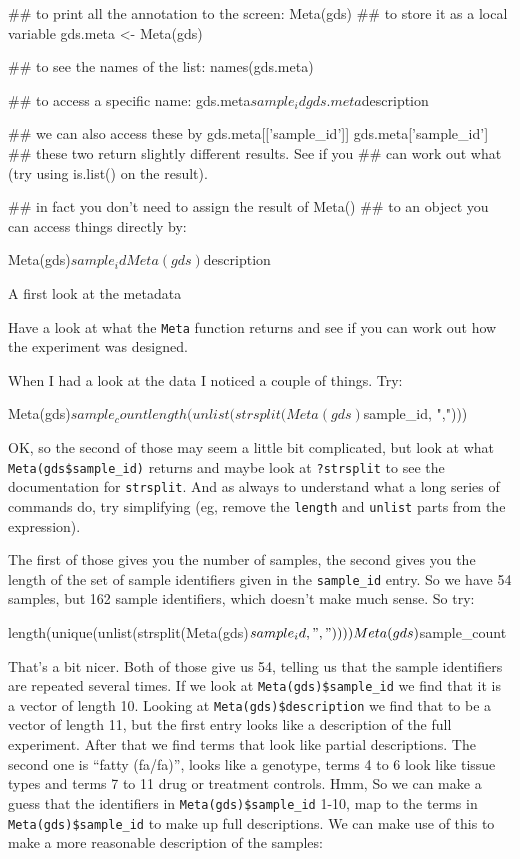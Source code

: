 \documentclass[11pt]{article}
\begin{document}
\begin{listing}
\begin{rcode}
  ## to print all the annotation to the screen:
  Meta(gds)
  ## to store it as a local variable
  gds.meta <- Meta(gds)
  
  ## to see the names of the list:
  names(gds.meta)

  ## to access a specific name:
  gds.meta$sample_id
  gds.meta$description

  ## we can also access these by
  gds.meta[['sample_id']]
  gds.meta['sample_id']
  ## these two return slightly different results. See if you
  ## can work out what (try using is.list() on the result).

  ## in fact you don't need to assign the result of Meta()
  ## to an object you can access things directly by:

  Meta(gds)$sample_id
  Meta(gds)$description
\end{rcode}
\caption{A first look at the metadata}
\label{lis2}
\end{listing}

Have a look at what the \texttt{Meta} function returns and see if you can
work out how the experiment was designed.

When I had a look at the data I noticed a couple of things. Try:

\begin{rcode}
  Meta(gds)$sample_count
  length(unlist( strsplit( Meta(gds)$sample_id, ",")))
\end{rcode}

OK, so the second of those may seem a little bit complicated, but look at
what \texttt{Meta(gds\$sample\_id)} returns and maybe look at 
\texttt{?strsplit} to see the documentation for \texttt{strsplit}. And
as always to understand what a long series of commands do, try simplifying
(eg, remove the \texttt{length} and \texttt{unlist} parts from the
expression).

The first of those gives you the number of samples, the second gives you
the length of the set of sample identifiers given in the \texttt{sample\_id}
entry. So we have 54 samples, but 162 sample identifiers, which doesn't
make much sense. So try:

\begin{rcode}
length(unique(unlist(strsplit(Meta(gds)$sample_id, ","))))
Meta(gds)$sample_count
\end{rcode}

That's a bit nicer. Both of those give us 54, telling us that the sample
identifiers are repeated several times. If we look at \texttt{Meta(gds)\$sample\_id}
we find that it is a vector of length 10. Looking at \texttt{Meta(gds)\$description}
we find that to be a vector of length 11, but the first entry looks like
a description of the full experiment. After that we find terms that look
like partial descriptions. The second one is ``fatty (fa/fa)'', looks like a
genotype, terms 4 to 6 look like tissue types and terms 7 to 11 drug or
treatment controls. Hmm, So we can make a guess that the identifiers in
\texttt{Meta(gds)\$sample\_id} 1-10, map to the terms in \texttt{Meta(gds)\$sample\_id}
to make up full descriptions. We can make use of this to make a more
reasonable description of the samples:
\end{document}
